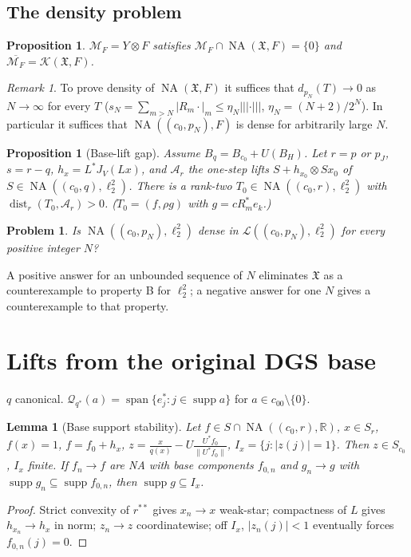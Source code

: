 \documentclass[10pt]{amsart}
\newtheorem{lemma}[theorem]{Lemma}
\newtheorem{proposition}[theorem]{Proposition}
\newtheorem{problem}[theorem]{Problem}
\theoremstyle{remark}
\newtheorem{remark}[theorem]{Remark}
\newcommand{\K}{\mathcal K}
\newcommand{\dist}{\operatorname{dist}}
\newcommand{\R}{\mathbb{R}}
\newcommand{\X}{\mathfrak{X}}
\newcommand{\NA}{\operatorname{NA}}
\newcommand{\Lin}{\mathcal{L}}
\newcommand{\tn}[1]{|\!|\!|#1|\!|\!|}
\newcommand{\supp}{\operatorname{supp}}
\newcommand{\spn}{\operatorname{span}}
\begin{document}
\subsection{The density problem}
\begin{proposition}\label{prop:lineable}
$\mathcal M_F=Y\otimes F$ satisfies $\mathcal M_F\cap\NA(\X,F)=\{0\}$ and $\overline{\mathcal M_F}=\K(\X,F)$.
\end{proposition}
\begin{remark}\label{rem:martin-tail}
To prove density of $\NA(\X,F)$ it suffices that $d_{p_N}(T)\to0$ as $N\to\infty$ for every $T$ ($s_N=\sum_{m>N}|R_m\cdot|_m\le\eta_N\tn{\cdot}$, $\eta_N=(N+2)/2^N$). In particular it suffices that $\NA((c_0,p_N),F)$ is dense for arbitrarily large $N$.
\end{remark}
\begin{proposition}[Base-lift gap]\label{prop:base-lift-gap}
Assume $B_q=B_{c_0}+U(B_H)$. Let $r=p$ or $p_J$, $s=r-q$, $h_x=L^*J_V(Lx)$, and $\mathscr A_r$ the one-step lifts $S+h_{x_0}\otimes Sx_0$ of $S\in\NA((c_0,q),\ell_2^2)$. There is a rank-two $T_0\in\NA((c_0,r),\ell_2^2)$ with $\dist_r(T_0,\mathscr A_r)>0$. ($T_0=(f,\rho g)$ with $g=cR_m^*e_k$.)
\end{proposition}
\begin{problem}\label{prob:blocks}
Is $\NA((c_0,p_N),\ell_2^2)$ dense in $\Lin((c_0,p_N),\ell_2^2)$ for every positive integer $N$?
\end{problem}
A positive answer for an unbounded sequence of $N$ eliminates $\X$ as a counterexample to property B for $\ell_2^2$; a negative answer for one $N$ gives a counterexample to that property.

\appendix
\section{Lifts from the original DGS base}
$q$ canonical. $\mathcal Q_{q^*}(a)=\spn\{e_j^*:j\in\supp a\}$ for $a\in c_{00}\setminus\{0\}$.
\begin{lemma}[Base support stability]\label{lem:base-support-stability}
Let $f\in S\cap\NA((c_0,r),\R)$, $x\in S_r$, $f(x)=1$, $f=f_0+h_x$, $z=\frac{x}{q(x)}-U\frac{U^*f_0}{\|U^*f_0\|}$, $I_x=\{j:|z(j)|=1\}$. Then $z\in S_{c_0}$, $I_x$ finite. If $f_n\to f$ are NA with base components $f_{0,n}$ and $g_n\to g$ with $\supp g_n\subseteq\supp f_{0,n}$, then $\supp g\subseteq I_x$.
\end{lemma}
\begin{proof}
Strict convexity of $r^{**}$ gives $x_n\to x$ weak-star; compactness of $L$ gives $h_{x_n}\to h_x$ in norm; $z_n\to z$ coordinatewise; off $I_x$, $|z_n(j)|<1$ eventually forces $f_{0,n}(j)=0$.
\end{proof}
\end{document}
